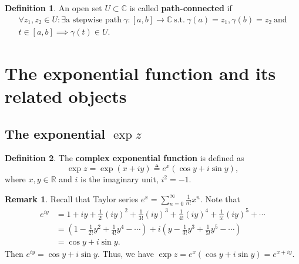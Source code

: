 \documentclass[12pt,openany]{book}
\theoremstyle{definition}
\newtheorem{definition}{Definition}[chapter]
\newtheorem{remark}{Remark}[section]
\newcommand{\R}{\mathbb{R}}
\newcommand{\C}{\mathbb{C}}
\newcommand{\of}[1]{\left( #1 \right)}
\begin{document}
	\begin{tcolorbox}[title=Path-connected;]
		\begin{definition}
			An open set $U\subset\C$ is called \textbf{path-connected} if \begin{align*}
			\forall z_1,z_2\in U:\exists\text{a stepwise path}\ \gamma:[a,b]\to\C\ \text{s.t.}\ \gamma(a)=z_1,\gamma(b)=z_2\ \text{and}\\
			t\in[a,b]\implies\gamma(t)\in U.
			\end{align*}
		\end{definition}
	\end{tcolorbox}
	
	\newpage
	\section{The exponential function and its related objects}
	
	\subsection{The exponential $\exp z$}
	\begin{tcolorbox}[colback=white,colframe=defcolor,arc=5pt,title={\color{white}\bf Complex Exponential}]
		\begin{definition}
			The \textbf{complex exponential function} is defined as
			\begin{equation*}
			\exp{z} =\exp{(x+iy)} \triangleq e^{x}(\cos y + i\sin y),
			\end{equation*}
			where $x,y\in\R$ and $i$ is the imaginary unit, $i^2=-1$.
		\end{definition}
	\end{tcolorbox}
	\begin{remark}
		Recall that Taylor series $e^x=\sum_{n=0}^\infty\frac{1}{n!}x^n$. Note that \begin{align*}
		e^{iy}&=1+iy+\frac{1}{2!}(iy)^2+\frac{1}{3!}(iy)^3+\frac{1}{4!}(iy)^4+\frac{1}{5!}(iy)^5+\cdots\\
		&=\of{1-\frac{1}{2!}y^2+\frac{1}{4!}y^4-\cdots}+i\of{y-\frac{1}{3!}y^3+\frac{1}{5!}y^5-\cdots}\\
		&=\cos y+i\sin y.
		\end{align*} Then $e^{iy}=\cos y+i\sin y$. Thus, we have $
		\exp z=e^x(\cos y+i\sin y)=e^{x+iy}.
		$
	\end{remark}
	
\end{document}
